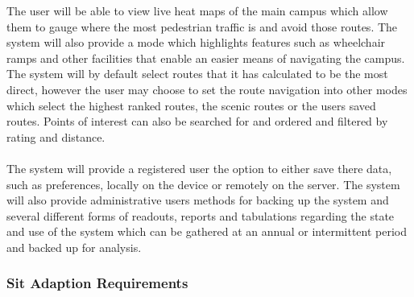 \documentclass{article}
\begin{document}
{            	The user will be able to view live heat maps of the main campus which allow them to gauge where the most pedestrian traffic is and avoid those routes. The system will also provide a mode which highlights features such as wheelchair ramps and other facilities that enable an easier means of navigating the campus. The system will by default select routes that it has calculated to be the most direct, however the user may choose to set the route navigation into other modes which select the highest ranked routes, the scenic routes or the users saved routes. Points of interest can also be searched for and ordered and filtered by rating and distance.\\\\
            	The system will provide a registered user the option to either save there data, such as preferences, locally on the device or remotely on the server. The system will also provide administrative users methods for backing up the system and several different forms of readouts, reports and tabulations regarding the state and use of the system which can be gathered at an annual or intermittent period and backed up for analysis.}
            \subsubsection{Sit Adaption Requirements}
        
\end{document}
